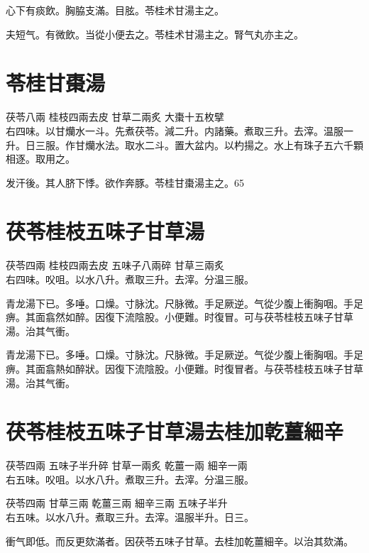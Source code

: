 心下有痰飲。胸脇支滿。目胘。苓桂术甘湯主之。

夫短气。有微飲。当從小便去之。苓桂术甘湯主之。腎气丸亦主之。

\section{苓桂甘棗湯}

茯苓{\scriptsize 八兩} 桂枝{\scriptsize 四兩去皮} 甘草{\scriptsize 二兩炙} 大棗{\scriptsize 十五枚擘}\\
右四味。以甘爤水一斗。先煮茯苓。減二升。内諸藥。煮取三升。去滓。温服一升。日三服。作甘爤水法。取水二斗。置大盆内。以杓揚之。水上有珠子五六千顆相逐。取用之。

发汗後。其人脐下悸。欲作奔豚。苓桂甘棗湯主之。65

\section{茯苓桂枝五味子甘草湯}

茯苓{\scriptsize 四兩} 桂枝{\scriptsize 四兩去皮} 五味子{\scriptsize 八兩碎} 甘草{\scriptsize 三兩炙}\\
右四味。㕮咀。以水八升。煮取三升。去滓。分温三服。

青龙湯下已。多唾。口燥。寸脉沈。尺脉微。手足厥逆。气從少腹上衝胸咽。手足痹。其面翕然如醉。因復下流陰股。小便難。时復冒。可与茯苓桂枝五味子甘草湯。治其气衝。{\wuben}

青龙湯下已。多唾。口燥。寸脉沈。尺脉微。手足厥逆。气從少腹上衝胸咽。手足痹。其面翕熱如醉狀。因復下流陰股。小便難。时復冒者。与茯苓桂枝五味子甘草湯。治其气衝。{\dengben}

\section{茯苓桂枝五味子甘草湯去桂加乾薑細辛}

茯苓{\scriptsize 四兩} 五味子{\scriptsize 半升碎} 甘草{\scriptsize 一兩炙} 乾薑{\scriptsize 一兩} 細辛{\scriptsize 一兩}\\
右五味。㕮咀。以水八升。煮取三升。去滓。分温三服。{\wuben}

茯苓{\scriptsize 四兩} 甘草{\scriptsize 三兩} 乾薑{\scriptsize 三兩} 細辛{\scriptsize 三兩} 五味子{\scriptsize 半升}\\
右五味。以水八升。煮取三升。去滓。温服半升。日三。{\dengben}

衝气即低。而反更欬滿者。因茯苓五味子甘草。去桂加乾薑細辛。以治其欬滿。{\wuben}

